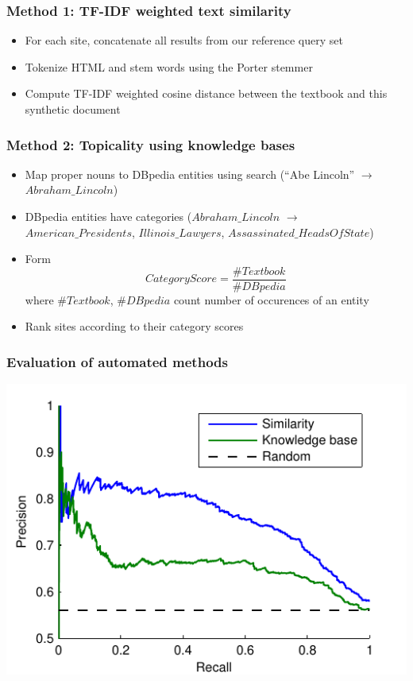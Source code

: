 \documentclass{beamer}
\begin{document}
\begin{frame}
\frametitle{Method 1: TF-IDF weighted text similarity}
\begin{itemize}
\item For each site, concatenate all results from our reference query set
\item Tokenize HTML and stem words using the Porter stemmer
\item Compute TF-IDF weighted cosine distance between the textbook and this synthetic
  document
\end{itemize}
\end{frame}

\begin{frame}
\frametitle{Method 2: Topicality using knowledge bases}
\begin{itemize}
\item Map proper nouns to DBpedia entities using search (``Abe Lincoln'' $\to$ $Abraham\_Lincoln$)
\item DBpedia entities have categories ($Abraham\_Lincoln$
  $\to$ $American\_Presidents$, $Illinois\_Lawyers$,
  $Assassinated\_HeadsOfState$)
\item Form
\begin{equation}
CategoryScore = \frac{\#Textbook}{\#DBpedia}
\end{equation}
where $\#Textbook$, $\#DBpedia$ count number of occurences of an entity 
\item Rank sites according to their category scores
\end{itemize}
\end{frame}

\begin{frame}
\frametitle{Evaluation of automated methods}
\begin{center}
\includegraphics{expt}
\end{center}
\end{frame}
\end{document}
